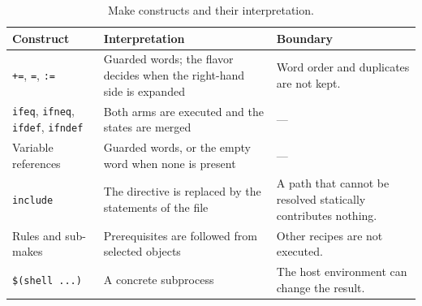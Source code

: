 \documentclass[acmsmall,screen,review,anonymous,nonacm]{acmart}
\begin{document}
  \begin{table}[t]
  \centering\footnotesize
  \caption{Make constructs and their interpretation.}
  \label{tab:scope}
  \begin{tabular}{p{26mm}p{45mm}p{50mm}}
  \toprule
  Construct & Interpretation & Boundary \\
  \midrule
  \texttt{+=}, \texttt{=}, \texttt{:=} & Guarded words; the flavor decides when the right-hand side is expanded & Word order and duplicates are not kept. \\
  \texttt{ifeq}, \texttt{ifneq}, \texttt{ifdef}, \texttt{ifndef} & Both arms are executed and the states are merged & --- \\
  Variable references & Guarded words, or the empty word when none is present & --- \\
  \texttt{include} & The directive is replaced by the statements of the file & A path that cannot be resolved statically contributes nothing. \\
  Rules and sub-makes & Prerequisites are followed from selected objects & Other recipes are not executed. \\
  \texttt{\$(shell ...)} & A concrete subprocess & The host environment can change the result. \\
  \bottomrule
  \end{tabular}
  \end{table}
\end{document}
